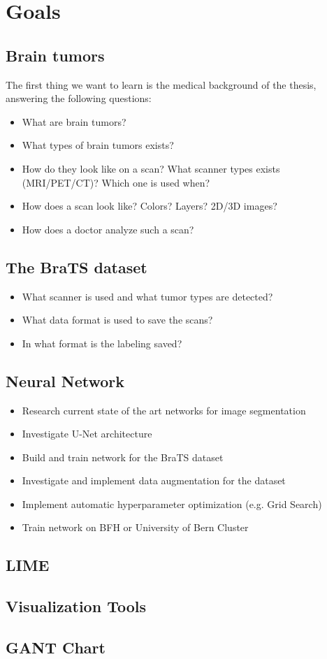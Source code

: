 \chapter{Goals}

\section{Brain tumors}
The first thing we want to learn is the medical background of the thesis, answering the following questions:
\begin{itemize}
    \item What are brain tumors?
    \item What types of brain tumors exists?
    \item How do they look like on a scan? What scanner types exists (MRI/PET/CT)? Which one is used when?
    \item How does a scan look like? Colors? Layers? 2D/3D images?
    \item How does a doctor analyze such a scan?
\end{itemize}

\section{The BraTS dataset}
\begin{itemize}
    \item What scanner is used and what tumor types are detected?
    \item What data format is used to save the scans?
    \item In what format is the labeling saved?
\end{itemize}

\section{Neural Network}

\begin{itemize}
    \item Research current state of the art networks for image segmentation
    \item Investigate U-Net architecture
    \item Build and train network for the BraTS dataset
    \item Investigate and implement data augmentation for the dataset
    \item Implement automatic hyperparameter optimization (e.g. Grid Search)
    \item Train network on BFH or University of Bern Cluster
\end{itemize}

\section{LIME}

\section{Visualization Tools}

\section{}


\section{GANT Chart}
